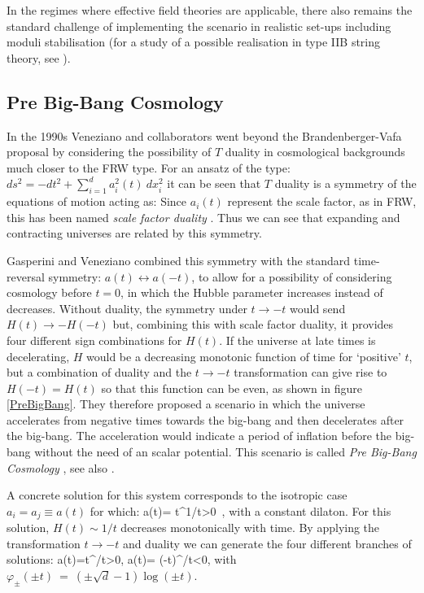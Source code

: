 In the regimes where effective field theories are applicable, there also remains the standard challenge of implementing the scenario in realistic set-ups including moduli stabilisation (for a study of a possible realisation in type IIB string theory, see \cite{Frey:2005jk}).

\subsection{Pre Big-Bang Cosmology}

In the 1990s Veneziano and collaborators went beyond the  Brandenberger-Vafa  proposal by considering the possibility of
 $T$ duality in cosmological backgrounds much closer to  the FRW type. For an ansatz  of the type:
$ds^2= -dt^2 + \sum_{i=1}^d a_i^2(t)\ dx_i^2$
it can be seen that $T$ duality is a symmetry of the 
equations of motion acting as:
\be
\setlength\fboxsep{0.25cm}
\setlength\fboxrule{0.4pt}
\ee
Since $a_i(t)$ represent the scale factor, as in FRW, this 
has been named {\it scale factor duality} \cite{Veneziano:1991ek}. Thus we can see that expanding and
contracting universes are related by this symmetry.

Gasperini and Veneziano combined this  symmetry with the standard time-reversal symmetry:
$a(t)\leftrightarrow a(-t)$, to allow for a possibility of considering cosmology before  $t=0$, in which the Hubble parameter increases instead of decreases.
Without duality, the symmetry under $t\rightarrow -t$ would send
$H(t)\rightarrow -H(-t)$ but, combining
 this with scale factor duality, it provides four different sign 
combinations for $ H(t)$. 
If the universe at late times is decelerating, $H$ would be a decreasing
 monotonic function of time for `positive' $t$, but a combination of duality
 and the 
$t\rightarrow -t$ transformation can give rise to  $H(-t) = H(t)$ so 
that this
 function can be even, as shown in figure \ref{PreBigBang}. They therefore proposed a scenario in which the universe accelerates from negative times
 towards the big-bang and then decelerates after the big-bang. The 
acceleration would 
indicate a period of inflation before the big-bang without the need of an
 scalar
 potential. This scenario is called {\it Pre Big-Bang Cosmology} \cite{Gasperini:1992em,Gasperini:2002bn,Gasperini:2007vw}, see also \cite{Tseytlin:1991wr}. 

A concrete solution for this system corresponds to the isotropic case
$a_i=a_j\equiv a(t)$ for which:
\be
a(t)= t^{1/}\qquad t>0\ , 
\ee
with a constant dilaton. For this solution, $H(t)\sim 1/t$ decreases monotonically 
with time. By applying the transformation $t\rightarrow -t$ and duality we
 can generate the four different branches of solutions:
\be
a(t)=t^{/}\qquad t>0, \qquad a(t)= \left(-t\right)^{/}\qquad t<0, \label{veneziano}
\ee
with 
$\varphi_\pm (\pm t)\ = \ (\pm\sqrt{d} - 1) \log(\pm t)$.


